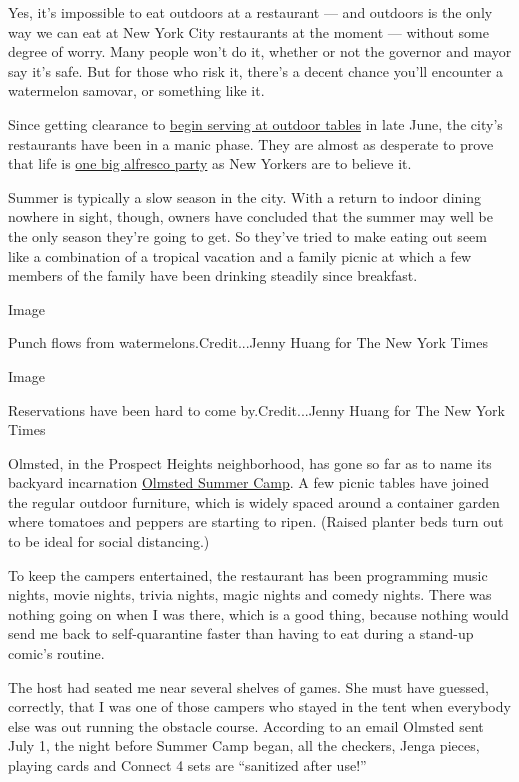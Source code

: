 Yes, it's impossible to eat outdoors at a restaurant --- and outdoors is
the only way we can eat at New York City restaurants at the moment ---
without some degree of worry. Many people won't do it, whether or not
the governor and mayor say it's safe. But for those who risk it, there's
a decent chance you'll encounter a watermelon samovar, or something like
it.

Since getting clearance to
\href{https://www.nytimes3xbfgragh.onion/2020/06/23/dining/outdoor-restaurants-nyc-coronavirus.html}{begin
serving at outdoor tables} in late June, the city's restaurants have
been in a manic phase. They are almost as desperate to prove that life
is
\href{https://www.nytimes3xbfgragh.onion/2020/07/09/dining/outdoor-dining-design-nyc-coronavirus.html}{one
big alfresco party} as New Yorkers are to believe it.

Summer is typically a slow season in the city. With a return to indoor
dining nowhere in sight, though, owners have concluded that the summer
may well be the only season they're going to get. So they've tried to
make eating out seem like a combination of a tropical vacation and a
family picnic at which a few members of the family have been drinking
steadily since breakfast.

Image

Punch flows from watermelons.Credit...Jenny Huang for The New York Times

Image

Reservations have been hard to come by.Credit...Jenny Huang for The New
York Times

Olmsted, in the Prospect Heights neighborhood, has gone so far as to
name its backyard incarnation \href{http://www.olmstednyc.com/}{Olmsted
Summer Camp}. A few picnic tables have joined the regular outdoor
furniture, which is widely spaced around a container garden where
tomatoes and peppers are starting to ripen. (Raised planter beds turn
out to be ideal for social distancing.)

To keep the campers entertained, the restaurant has been programming
music nights, movie nights, trivia nights, magic nights and comedy
nights. There was nothing going on when I was there, which is a good
thing, because nothing would send me back to self-quarantine faster than
having to eat during a stand-up comic's routine.

The host had seated me near several shelves of games. She must have
guessed, correctly, that I was one of those campers who stayed in the
tent when everybody else was out running the obstacle course. According
to an email Olmsted sent July 1, the night before Summer Camp began, all
the checkers, Jenga pieces, playing cards and Connect 4 sets are
``sanitized after use!''

